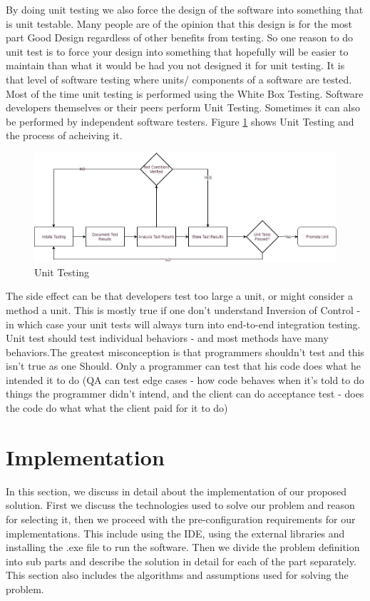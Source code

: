 \documentclass[article,type=msc,colorback,accentcolor=tud9c,twoside,11pt]{tudthesis}
\begin{document}
 By doing unit testing we also force the design of the software into something that is unit testable. Many people are of the opinion that this design is for the most part Good Design regardless of other benefits from testing. So one reason to do unit test is to force your design into something that hopefully will be easier to maintain than what it would be had you not designed it for unit testing. It is that level of software testing where units/ components of a software are tested. Most of the time unit testing is performed using the White Box Testing. Software developers themselves or their peers perform Unit Testing. Sometimes it can also be performed by independent software testers. Figure \ref{fig:UnitTesting} shows Unit Testing and the process of acheiving it.
\begin{figure}[h]
	\centering
	\includegraphics[scale=0.5]{UnitTesting.jpg}
	\caption{Unit Testing}
	\label{fig:UnitTesting}
\end{figure}

The side effect can be that developers test too large a unit, or might consider a method a unit. This is mostly true if one don't understand Inversion of Control - in which case your unit tests will always turn into end-to-end integration testing. Unit test should test individual behaviors - and most methods have many behaviors.The greatest misconception is that programmers shouldn't test and this isn't true as one Should. Only a programmer can test that his code does what he intended it to do (QA can test edge cases - how code behaves when it's told to do things the programmer didn't intend, and the client can do acceptance test - does the code do what what the client paid for it to do)
\clearpage
\section{Implementation}
In this section, we discuss in detail about the implementation of our proposed solution. First we discuss the technologies used to solve our problem and reason for selecting it, then we proceed with the pre-configuration requirements for our implementations. This include using the IDE, using the external libraries and installing the .exe file to run the software. Then we divide the problem definition into sub parts and describe the solution in detail for each of the part separately. This section also includes the algorithms and assumptions used for solving the problem.
\end{document}
